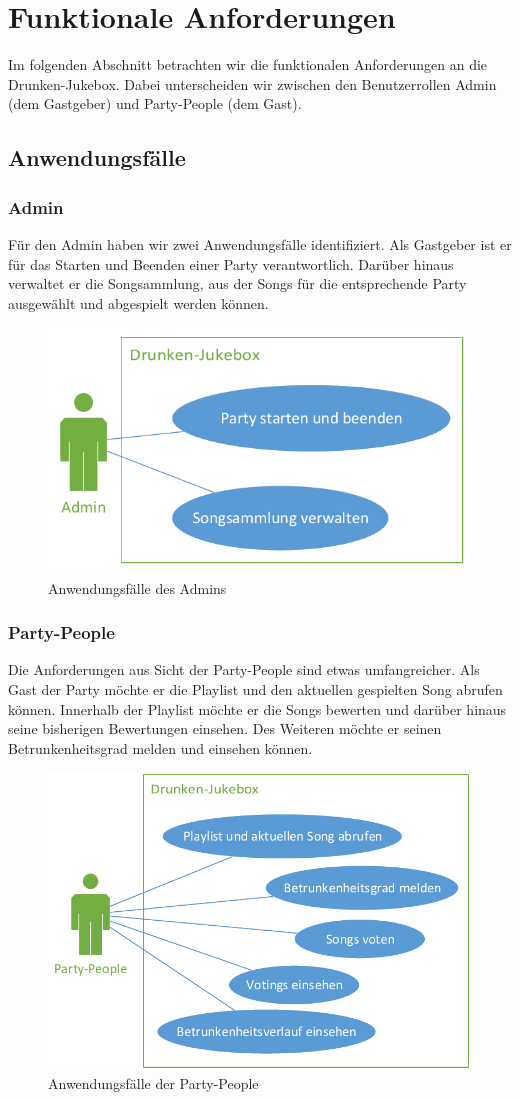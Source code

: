 \newpage
\section{Funktionale Anforderungen}
Im folgenden Abschnitt betrachten wir die funktionalen Anforderungen an die Drunken-Jukebox. Dabei unterscheiden wir zwischen den Benutzerrollen Admin (dem Gastgeber) und Party-People (dem Gast).  

\subsection{Anwendungsfälle}
\subsubsection{Admin}
Für den Admin haben wir zwei Anwendungsfälle identifiziert. Als Gastgeber ist er für das Starten und Beenden einer Party verantwortlich. Darüber hinaus verwaltet er die Songsammlung, aus der Songs für die entsprechende Party ausgewählt und abgespielt werden können.

\begin{figure}[H]
\centering
\includegraphics[width=0.75\linewidth]{Bilder/AdminUseCase}
\caption{Anwendungsfälle des Admins}
\label{fig:AdminUseCase}
\end{figure}

\newpage
\subsubsection{Party-People}
Die Anforderungen aus Sicht der Party-People sind etwas umfangreicher. Als Gast der Party möchte er die Playlist und den aktuellen gespielten Song abrufen können. Innerhalb der Playlist möchte er die Songs bewerten und darüber hinaus seine bisherigen Bewertungen einsehen. Des Weiteren möchte er seinen Betrunkenheitsgrad melden und einsehen können.

\begin{figure}[H]
\centering
\includegraphics[width=0.95\linewidth]{Bilder/PartyPeopleUseCase}
\caption{Anwendungsfälle der Party-People}
\label{fig:PartyPeopleUseCase}
\end{figure}
